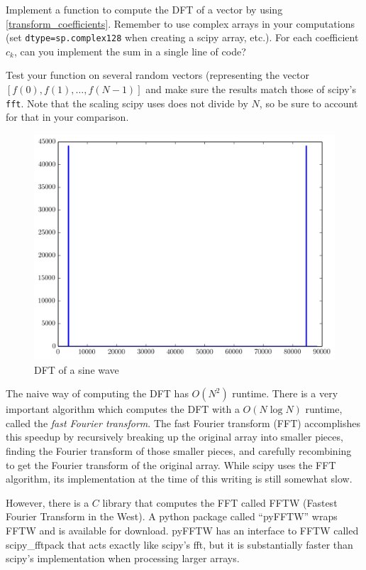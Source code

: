 \begin{problem} %
Implement a function to compute the DFT of a vector by using \eqref{transform_coefficients}.
Remember to use complex arrays in your computations (set \texttt{dtype=sp.complex128} when creating a scipy array, etc.).
For each coefficient $c_k$, can you implement the sum in a single line of code?

Test your function on several random vectors (representing the vector $[f(0),f(1),\dots,f(N-1)]$ and make sure the results match those of scipy's \texttt{fft}. 
Note that the scaling scipy uses does not divide by $N$, so be sure to account for that in your comparison.
\end{problem}


\begin{figure}[ht]\caption{DFT of a sine wave}\label{sinespec}\centering\includegraphics[width=\textwidth]{sinespec}\end{figure}

The naive way of computing the DFT has $O(N^2)$ runtime.
There is a very important algorithm which computes the DFT with a $O(N \log N)$ runtime, called the \emph{fast Fourier transform}.
The fast Fourier transform (FFT) accomplishes this speedup by recursively breaking up the original array into smaller pieces, finding the Fourier transform of those smaller pieces, and carefully recombining to get the Fourier transform of the original array.
While scipy uses the FFT algorithm, its implementation at the time of this writing is still somewhat slow.

However, there is a $C$ library that computes the FFT called FFTW (Fastest Fourier Transform in the West).
A python package called ``pyFFTW'' wraps FFTW and is available for download. %
pyFFTW  has an interface to FFTW called scipy\_fftpack that acts exactly like scipy's fft, but it is substantially faster than scipy's implementation when processing larger arrays.

